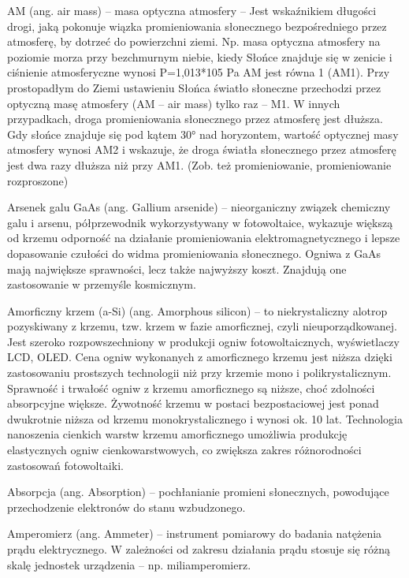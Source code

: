 \documentclass[12pt,a4paper]{article}
\begin{document}
AM (ang. air mass) – masa optyczna atmosfery – Jest wskaźnikiem długości drogi, jaką pokonuje wiązka promieniowania słonecznego bezpośredniego przez atmosferę, by dotrzeć do powierzchni ziemi. Np. masa optyczna atmosfery na poziomie morza przy bezchmurnym niebie, kiedy Słońce znajduje się w zenicie i ciśnienie atmosferyczne wynosi P=1,013*105 Pa AM jest równa 1 (AM1). Przy prostopadłym do Ziemi ustawieniu Słońca światło słoneczne przechodzi przez optyczną masę atmosfery (AM – air mass) tylko raz – M1. W innych przypadkach, droga promieniowania słonecznego przez atmosferę jest dłuższa. Gdy słońce znajduje się pod kątem 30° nad horyzontem, wartość optycznej masy atmosfery wynosi AM2 i wskazuje, że droga światła słonecznego przez atmosferę jest dwa razy dłuższa niż przy AM1. (Zob. też promieniowanie, promieniowanie rozproszone)

Arsenek galu GaAs (ang. Gallium arsenide) – nieorganiczny związek chemiczny galu i arsenu, półprzewodnik wykorzystywany w fotowoltaice, wykazuje większą od krzemu odporność na działanie promieniowania elektromagnetycznego i lepsze dopasowanie czułości do widma promieniowania słonecznego. Ogniwa z GaAs mają największe sprawności, lecz także najwyższy koszt. Znajdują one zastosowanie w przemyśle kosmicznym.

Amorficzny krzem (a-Si) (ang. Amorphous silicon) – to niekrystaliczny alotrop pozyskiwany z krzemu, tzw. krzem w fazie amorficznej, czyli nieuporządkowanej. Jest szeroko rozpowszechniony w produkcji ogniw fotowoltaicznych, wyświetlaczy LCD, OLED. Cena ogniw wykonanych z amorficznego krzemu jest niższa dzięki zastosowaniu prostszych technologii niż przy krzemie mono i polikrystalicznym. Sprawność i trwałość ogniw z krzemu amorficznego są niższe, choć zdolności absorpcyjne większe. Żywotność krzemu w postaci bezpostaciowej jest ponad dwukrotnie niższa od krzemu monokrystalicznego i wynosi ok. 10 lat. Technologia nanoszenia cienkich warstw krzemu amorficznego umożliwia produkcję elastycznych ogniw cienkowarstwowych, co zwiększa zakres różnorodności zastosowań fotowoltaiki.

Absorpcja (ang. Absorption) – pochłanianie promieni słonecznych, powodujące przechodzenie elektronów do stanu wzbudzonego.

Amperomierz (ang. Ammeter) – instrument pomiarowy do badania natężenia prądu elektrycznego. W zależności od zakresu działania prądu stosuje się różną skalę jednostek urządzenia – np. miliamperomierz.
\end{document}
